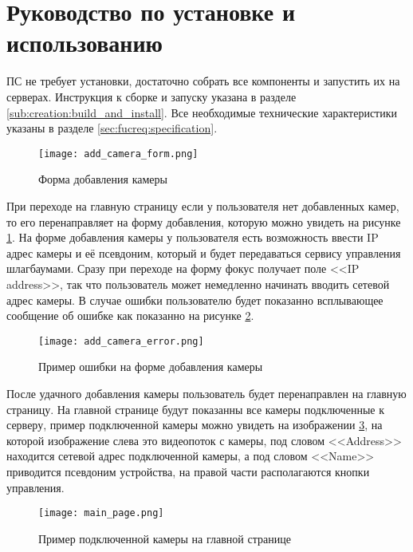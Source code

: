 \section{Руководство по установке и использованию} 
\label{sec:user_guide}

ПС не требует установки, достаточно собрать все компоненты и запустить их на серверах. Инструкция к сборке и запуску указана в разделе \ref{sub:creation:build_and_install}.
Все необходимые технические характеристики указаны в разделе \ref{sec:fucreq:specification}.

\begin{figure}[ht]
  \centering
  \texttt{[image: add\_camera\_form.png]} 
  \caption{Форма добавления камеры} 
  \label{sec:user_guide:add_camera}
\end{figure}

При переходе на главную страницу если у пользователя нет добавленных камер, то его перенаправляет на форму добавления, которую можно увидеть на рисунке \ref{sec:user_guide:add_camera}. На форме добавления камеры у пользователя есть возможность ввести IP адрес камеры и её псевдоним, который и будет передаваться сервису управления шлагбаумами. Сразу при переходе на форму фокус получает поле <<IP address>>, так что пользователь может немедленно начинать вводить сетевой адрес камеры. В случае ошибки пользователю будет показанно всплывающее сообщение об ошибке как показанно на рисунке \ref{sec:user_guide:add_camera_error}.

\begin{figure}[ht]
  \centering
  \texttt{[image: add\_camera\_error.png]} 
  \caption{Пример ошибки на форме добавления камеры} 
  \label{sec:user_guide:add_camera_error}
\end{figure}

После удачного добавления камеры пользователь будет перенаправлен на главную страницу. На главной странице будут показанны все камеры подключенные к серверу, пример подключенной камеры можно увидеть на изображении \ref{sec:user_guide:main_page_camera}, на которой изображение слева это видеопоток с камеры, под словом <<Address>> находится сетевой адрес подключенной камеры, а под словом <<Name>> приводится псевдоним устройства, на правой части располагаются кнопки управления. 

\begin{figure}[ht]
  \centering
  \texttt{[image: main\_page.png]} 
  \caption{Пример подключенной камеры на главной странице} 
  \label{sec:user_guide:main_page_camera}
\end{figure}

